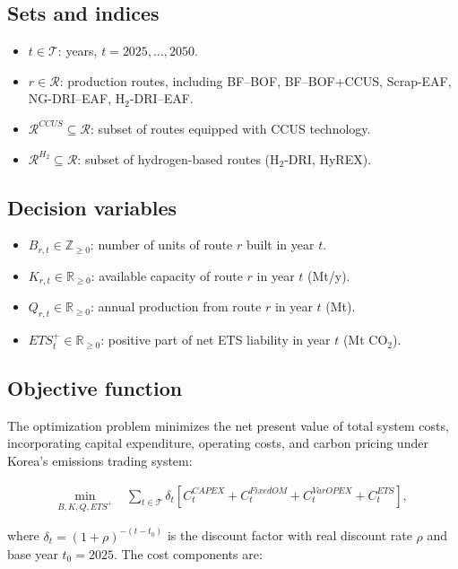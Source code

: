 \documentclass[preprint,1p,authoryear]{elsarticle}
\begin{document}
\subsection{Sets and indices}
\begin{itemize}[leftmargin=*]
    \item $t \in \mathcal{T}$: years, $t = 2025, \dots, 2050$.
    \item $r \in \mathcal{R}$: production routes, including BF--BOF, BF--BOF+CCUS, Scrap-EAF, NG-DRI--EAF, H$_2$-DRI--EAF.
    \item $\mathcal{R}^{CCUS} \subseteq \mathcal{R}$: subset of routes equipped with CCUS technology.
    \item $\mathcal{R}^{H_2} \subseteq \mathcal{R}$: subset of hydrogen-based routes (H$_2$-DRI, HyREX).
\end{itemize}

\subsection{Decision variables}
\begin{itemize}[leftmargin=*]
    \item $B_{r,t} \in \mathbb{Z}_{\ge 0}$: number of units of route $r$ built in year $t$.
    \item $K_{r,t} \in \mathbb{R}_{\ge 0}$: available capacity of route $r$ in year $t$ (Mt/y).
    \item $Q_{r,t} \in \mathbb{R}_{\ge 0}$: annual production from route $r$ in year $t$ (Mt).
    \item $ETS_{t}^{+} \in \mathbb{R}_{\ge 0}$: positive part of net ETS liability in year $t$ (Mt CO$_2$).
\end{itemize}

\subsection{Objective function}

The optimization problem minimizes the net present value of total system costs, incorporating capital expenditure, operating costs, and carbon pricing under Korea's emissions trading system:

\begin{align}
\min_{B,K,Q,ETS^+} \; & \sum_{t \in \mathcal{T}} \delta_t \left[ C^{CAPEX}_t + C^{FixedOM}_t + C^{VarOPEX}_t + C^{ETS}_t \right],
\end{align}

where $\delta_t = (1+\rho)^{-(t-t_0)}$ is the discount factor with real discount rate $\rho$ and base year $t_0 = 2025$. The cost components are:
\end{document}
